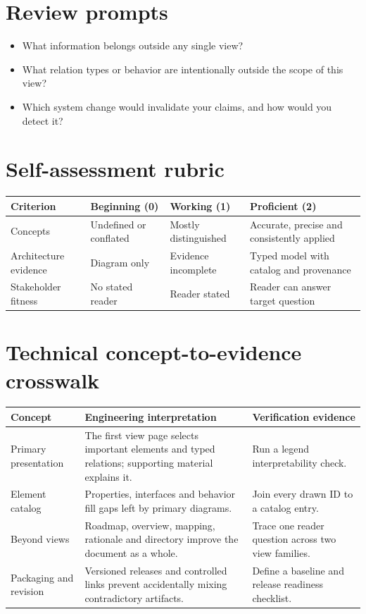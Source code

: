 \documentclass[10pt,letterpaper]{article}
\begin{document}
\section{Review prompts}
\begin{itemize}
\item What information belongs outside any single view?
\item What relation types or behavior are intentionally outside the scope of this view?
\item Which system change would invalidate your claims, and how would you detect it?
\end{itemize}
\section{Self-assessment rubric}
\small
\begin{tabularx}{\linewidth}{@{}YYYY@{}}
\toprule
\textbf{Criterion} & \textbf{Beginning (0)} & \textbf{Working (1)} & \textbf{Proficient (2)} \\
\midrule
Concepts & Undefined or conflated & Mostly distinguished & Accurate, precise and consistently applied \\
Architecture evidence & Diagram only & Evidence incomplete & Typed model with catalog and provenance \\
Stakeholder fitness & No stated reader & Reader stated & Reader can answer target question \\
\bottomrule
\end{tabularx}
\normalsize
\section{Technical concept-to-evidence crosswalk}
\small
\begin{tabularx}{\linewidth}{@{}YYY@{}}
\toprule
\textbf{Concept} & \textbf{Engineering interpretation} & \textbf{Verification evidence} \\
\midrule
Primary presentation & The first view page selects important elements and typed relations; supporting material explains it. & Run a legend interpretability check. \\
Element catalog & Properties, interfaces and behavior fill gaps left by primary diagrams. & Join every drawn ID to a catalog entry. \\
Beyond views & Roadmap, overview, mapping, rationale and directory improve the document as a whole. & Trace one reader question across two view families. \\
Packaging and revision & Versioned releases and controlled links prevent accidentally mixing contradictory artifacts. & Define a baseline and release readiness checklist. \\
\bottomrule
\end{tabularx}
\normalsize
\end{document}

